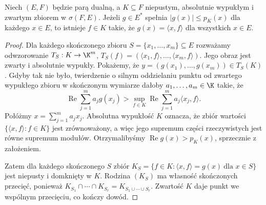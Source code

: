 \begin{lemat}\label{lem:compact-domination}
Niech $(E,F)$ będzie parą dualną, a $K\subseteq F$ niepustym,
absolutnie wypukłym i zwartym zbiorem w $\sigma(F,E)$.
Jeżeli $g\in E^*$ spełnia
$|g(x)|\le p_K(x)$ dla każdego $x\in E$,
to istnieje $f\in K$ takie, że
$g(x)=\langle x,f\rangle$ dla wszystkich $x\in E$.
\end{lemat}
\begin{proof}
Dla każdego skończonego zbioru $S=\{x_1,\ldots,x_m\}\subseteq E$
rozważamy odwzorowanie
$T_S:K\to\K^m$, $T_S(f)=(\langle x_1,f\rangle,\ldots,
\langle x_m,f\rangle)$. Jego obraz jest zwarty i absolutnie wypukły.
Pokażemy, że $y=(g(x_1),\ldots,g(x_m))\in T_S(K)$.
Gdyby tak nie było, twierdzenie o silnym oddzielaniu punktu
od zwartego wypukłego zbioru w skończonym wymiarze dałoby
$a_1,\ldots,a_m\in\K$ takie, że
\[
 \operatorname{Re}\sum_{j=1}^m a_jg(x_j)
 >\sup_{f\in K}\operatorname{Re}
       \sum_{j=1}^m a_j\langle x_j,f\rangle.
\]
Połóżmy $x=\sum_{j=1}^m a_jx_j$.
Absolutna wypukłość $K$ oznacza, że zbiór wartości
$\{\langle x,f\rangle:f\in K\}$ jest zrównoważony,
a więc jego supremum części rzeczywistych jest równe
supremum modułów. Otrzymalibyśmy
$\operatorname{Re}g(x)>p_K(x)$, sprzecznie z założeniem.

Zatem dla każdego skończonego $S$ zbiór
$K_S=\{f\in K:\langle x,f\rangle=g(x)\ \text{dla }x\in S\}$
jest niepusty i domknięty w $K$. Rodzina $(K_S)$ ma
własność skończonych przecięć, ponieważ
$K_{S_1}\cap\cdots\cap K_{S_r}=K_{S_1\cup\cdots\cup S_r}$.
Zwartość $K$ daje punkt we wspólnym przecięciu,
co kończy dowód.
\end{proof}

